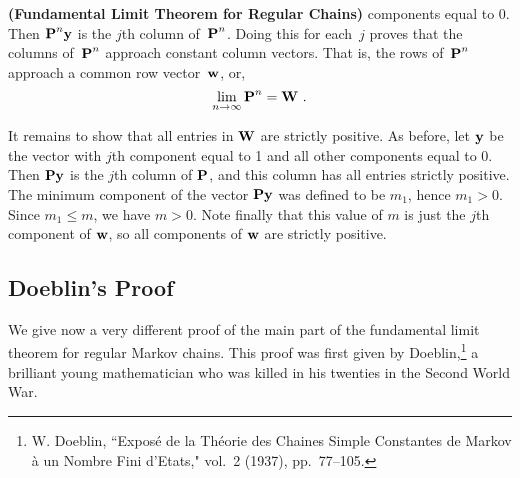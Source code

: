 \begin{theorem}{\bf (Fundamental Limit Theorem for Regular Chains)}
components equal to
0. Then ${\mbox{\bf P}\/}^n {\mbox{\bf y}\/}$ is the
$j$th column of~${\mbox{\bf P}\/}^n$.  Doing this for each~$j$ proves that the columns
of~${\mbox{\bf P}\/}^n$ approach constant column vectors.  That is, the rows of~${\mbox{\bf P}\/}^n$
approach a common row vector~${\mbox{\bf w}\/}$, or,
$$
\lim_{n \to \infty} \mat {P}^n = \mat {W}\ .  \label{eq 11.4.5}
$$
\par
It remains to show that all entries in ${\mbox{\bf W}\/}$ are strictly positive.  As
before, let
${\mbox{\bf y}\/}$ be the vector with $j$th component equal to 1 and all other
components equal to 0.  
Then ${\mbox{\bf P}\/}{\mbox{\bf y}\/}$ is the $j$th column of ${\mbox{\bf P}\/}$, and this column has all
entries strictly
positive.  The minimum component of the vector ${\mbox{\bf P}\/}{\mbox{\bf y}\/}$ was defined to
be $m_1$, hence
$m_1 > 0$.  Since $m_1 \le m$, we have $m > 0$.  Note finally that this value
of $m$ is just the
$j$th component of ${\mbox{\bf w}\/}$, so all components of ${\mbox{\bf w}\/}$ are strictly
positive. 
\end{theorem}

\subsection*{Doeblin's Proof}
We give now a very different proof of the main part of the fundamental limit
theorem for 
regular Markov chains.  This proof was first given by Doeblin,\footnote{W. Doeblin, ``Expos\'e de la Th\'eorie des Chaines Simple Constantes
de Markov \`a un
Nombre Fini d'Etats,"  vol.~2
(1937), pp.~77--105.} a brilliant young  mathematician who was killed in
his twenties in the Second World War. 

